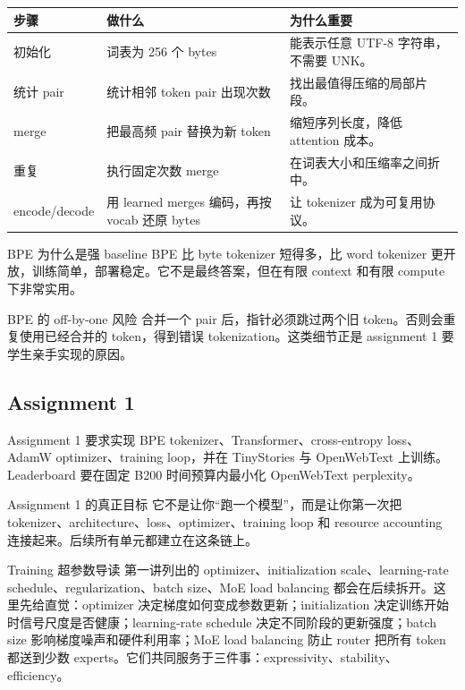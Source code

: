 \documentclass[a4paper]{article}
\begin{document}
\begin{longtable}{p{}p{}p{}}
\toprule
\textbf{步骤} & \textbf{做什么} & \textbf{为什么重要} \\
\midrule
初始化 & 词表为 256 个 bytes & 能表示任意 UTF-8 字符串，不需要 UNK。 \\
统计 pair & 统计相邻 token pair 出现次数 & 找出最值得压缩的局部片段。 \\
merge & 把最高频 pair 替换为新 token & 缩短序列长度，降低 attention 成本。 \\
重复 & 执行固定次数 merge & 在词表大小和压缩率之间折中。 \\
encode/decode & 用 learned merges 编码，再按 vocab 还原 bytes & 让 tokenizer 成为可复用协议。 \\
\bottomrule
\end{longtable}

\begin{importantbox}{BPE 为什么是强 baseline}
BPE 比 byte tokenizer 短得多，比 word tokenizer 更开放，训练简单，部署稳定。它不是最终答案，但在有限 context 和有限 compute 下非常实用。
\end{importantbox}

\begin{warningbox}{BPE 的 off-by-one 风险}
合并一个 pair 后，指针必须跳过两个旧 token。否则会重复使用已经合并的 token，得到错误 tokenization。这类细节正是 assignment 1 要学生亲手实现的原因。
\end{warningbox}

\subsection{Assignment 1}

Assignment 1 要求实现 BPE tokenizer、Transformer、cross-entropy loss、AdamW optimizer、training loop，并在 TinyStories 与 OpenWebText 上训练。Leaderboard 要在固定 B200 时间预算内最小化 OpenWebText perplexity。

\begin{importantbox}{Assignment 1 的真正目标}
它不是让你“跑一个模型”，而是让你第一次把 tokenizer、architecture、loss、optimizer、training loop 和 resource accounting 连接起来。后续所有单元都建立在这条链上。
\end{importantbox}

\begin{knowledgebox}{Training 超参数导读}
第一讲列出的 optimizer、initialization scale、learning-rate schedule、regularization、batch size、MoE load balancing 都会在后续拆开。这里先给直觉：optimizer 决定梯度如何变成参数更新；initialization 决定训练开始时信号尺度是否健康；learning-rate schedule 决定不同阶段的更新强度；batch size 影响梯度噪声和硬件利用率；MoE load balancing 防止 router 把所有 token 都送到少数 experts。它们共同服务于三件事：expressivity、stability、efficiency。
\end{knowledgebox}
\end{document}
